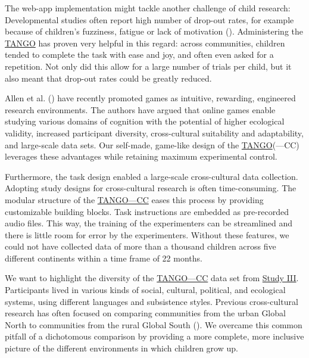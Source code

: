 \documentclass[
]{scrbook}
\begin{document}
The web-app implementation might tackle another challenge of child research: Developmental studies often report high number of drop-out rates, for example because of children's fuzziness, fatigue or lack of motivation (). Administering the \hyperref[acronyms_TANGO]{TANGO} has proven very helpful in this regard: across communities, children tended to complete the task with ease and joy, and often even asked for a repetition. Not only did this allow for a large number of trials per child, but it also meant that drop-out rates could be greatly reduced.

Allen et al. () have recently promoted games as intuitive, rewarding, engineered research environments. The authors have argued that online games enable studying various domains of cognition with the potential of higher ecological validity, increased participant diversity, cross-cultural suitability and adaptability, and large-scale data sets. Our self-made, game-like design of the \hyperref[acronyms_TANGO]{TANGO}(---CC) leverages these advantages while retaining maximum experimental control.

Furthermore, the task design enabled a large-scale cross-cultural data collection. Adopting study designs for cross-cultural research is often time-consuming. The modular structure of the \hyperref[acronyms_TANGOux2014CC]{TANGO---CC} eases this process by providing customizable building blocks. Task instructions are embedded as pre-recorded audio files. This way, the training of the experimenters can be streamlined and there is little room for error by the experimenters. Without these features, we could not have collected data of more than a thousand children across five different continents within a time frame of 22 months.

We want to highlight the diversity of the \hyperref[acronyms_TANGOux2014CC]{TANGO---CC} data set from \hyperref[studyIII]{Study III}. Participants lived in various kinds of social, cultural, political, and ecological systems, using different languages and subsistence styles. Previous cross-cultural research has often focused on comparing communities from the urban Global North to communities from the rural Global South (). We overcame this common pitfall of a dichotomous comparison by providing a more complete, more inclusive picture of the different environments in which children grow up.
\end{document}

